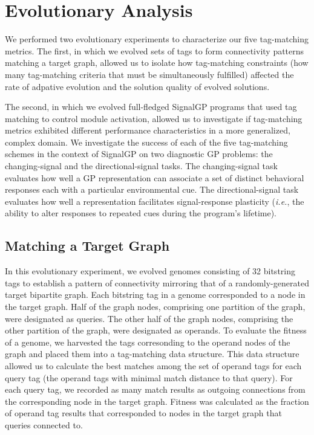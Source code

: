 \section{Evolutionary Analysis}



We performed two evolutionary experiments to characterize our five tag-matching metrics.
The first, in which we evolved sets of tags to form connectivity patterns matching a target graph, allowed us to isolate how tag-matching constraints (how many tag-matching criteria that must be simultaneously fulfilled) affected the rate of adpative evolution and the solution quality of evolved solutions.

The second, in which we evolved full-fledged SignalGP programs that used tag matching to control module activation, allowed us to investigate if tag-matching metrics exhibited different performance characteristics in a more generalized, complex domain.
We investigate the success of each of the five tag-matching schemes in the context of SignalGP on two diagnostic GP problems: the changing-signal and the directional-signal tasks.
The changing-signal task evaluates how well a GP representation can associate a set of distinct behavioral responses each with a particular environmental cue.
The directional-signal task evaluates how well a representation facilitates signal-response plasticity (\textit{i.e.}, the ability to alter responses to repeated cues during the program's lifetime).

\subsection{Matching a Target Graph}

In this evolutionary experiment, we evolved genomes consisting of 32 bitstring tags to establish a pattern of connectivity mirroring that of a randomly-generated target bipartite graph.
Each bitstring tag in a genome corresponded to a node in the target graph.
Half of the graph nodes, comprising one partition of the graph, were designated as queries.
The other half of the graph nodes, comprising the other partition of the graph, were designated as operands.
To evaluate the fitness of a genome, we harvested the tags corresonding to the operand nodes of the graph and placed them into a tag-matching data structure.
This data structure allowed us to calculate the best matches among the set of operand tags for each query tag (the operand tags with minimal match distance to that query).
For each query tag, we recorded as many match results as outgoing connections from the corresponding node in the target graph.
Fitness was calculated as the fraction of operand tag results that corresponded to nodes in the target graph that queries connected to.

